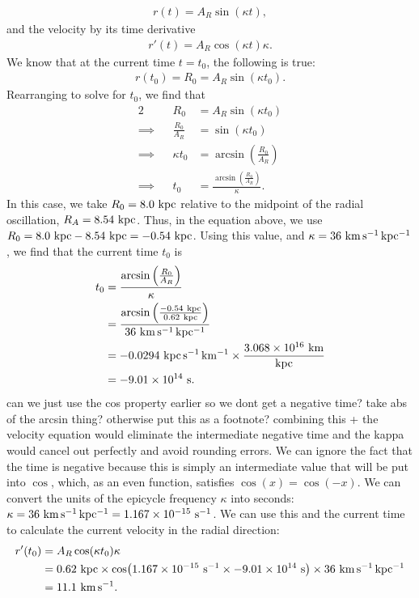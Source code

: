 \documentclass[11pt,letterpaper]{article}
\begin{document}
\begin{enumerate}[label=(\alph*)]
\begin{align*}
            r(t) = A_R\sin{(\kappa t)},
        \end{align*}
        and the velocity by its time derivative 
        \begin{align*}
            r'(t) = A_R\cos{(\kappa t)}\kappa.
        \end{align*}
        We know that at the current time $t=t_0$, the following is true:
        \begin{align*}
            r(t_0) = R_0 = A_R\sin{(\kappa t_0)}.
        \end{align*}
        Rearranging to solve for $t_0$, we find that 
        \begin{alignat*}{2}
            &&R_0 &= A_R\sin{(\kappa t_0)} \\
            \implies&&\frac{R_0}{A_R} &= \sin{(\kappa t_0)} \\
            \implies&&\kappa t_0 &= \arcsin{\left(\frac{R_0}{A_R}\right)} \\
            \implies&&t_0 &= \frac{\arcsin{\left(\frac{R_0}{A_R}\right)}}{\kappa}.
        \end{alignat*}
        In this case, we take $R_0 = 8.0~{\rm kpc}$ relative to the midpoint of the radial oscillation, $R_A = 8.54~{\rm kpc}$. Thus, in the equation above, we use $R_0 = 8.0~{\rm kpc} - 8.54~{\rm kpc} = -0.54~{\rm kpc}$. Using this value, and $\kappa = 36~{\rm km\,s^{-1}\,kpc^{-1}}$, we find that the current time $t_0$ is 
        \begin{align*}
            t_0 &= \frac{\arcsin{\left(\frac{R_0}{A_R}\right)}}{\kappa} \\
            &= \frac{\arcsin{\left(\frac{-0.54~{\rm kpc}}{0.62~{\rm kpc}}\right)}}{36~{\rm km\,s^{-1}\,kpc^{-1}}} \\
            &= -0.0294~{\rm kpc\,s^{-1}\,km^{-1}} \times \frac{3.068\times 10^{16}~{\rm km}}{{\rm kpc}} \\
            &= -9.01\times 10^{14}~{\rm s}.
        \end{align*}
        {\huge can we just use the cos property earlier so we dont get a negative time? take abs of the arcsin thing? otherwise put this as a footnote? combining this + the velocity equation would eliminate the intermediate negative time and the kappa would cancel out perfectly and avoid rounding errors.}
        We can ignore the fact that the time is negative because this is simply an intermediate value that will be put into $\cos$, which, as an even function, satisfies $\cos(x) = \cos(-x)$.
        We can convert the units of the epicycle frequency $\kappa$ into seconds: $\kappa = 36~{\rm km\,s^{-1}\,kpc^{-1}} = 1.167\times 10^{-15}~{\rm s^{-1}}$. We can use this and the current time to calculate the current velocity in the radial direction:
        \begin{align*}
            r'(t_0) &= A_R\cos(\kappa t_0)\kappa \\
            &= 0.62~{\rm kpc}\times \cos(1.167\times 10^{-15}~{\rm s^{-1}}\times -9.01\times 10^{14}~{\rm s})\times 36~{\rm km\,s^{-1}\,kpc^{-1}} \\
            &= 11.1~{\rm km\,s^{-1}}.
        \end{align*}


\end{enumerate}
\end{document}
